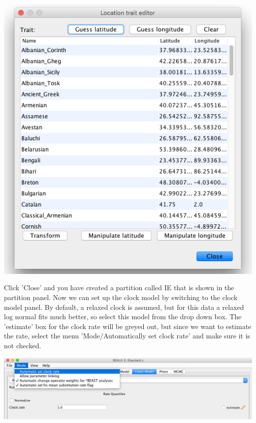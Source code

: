 \documentclass{article}
\begin{document}
\begin{center}
\includegraphics[scale=0.4]{figures/BEAUti_transform4}
\end{center}

Click 'Close' and you have created a partition called IE that is shown in the partition panel. Now we can set up the clock model by switching to the clock model panel. By default, a relaxed clock is assumed, but for this data a relaxed log normal fits much better, so select this model from the drop down box. The 'estimate' box for the clock rate will be greyed out, but since we want to estimate the rate, select the menu 'Mode/Automatically set clock rate' and make sure it is not checked. 

\begin{center}
\includegraphics[scale=0.4]{figures/BEAUti_transform5}
\end{center}
\end{document}
